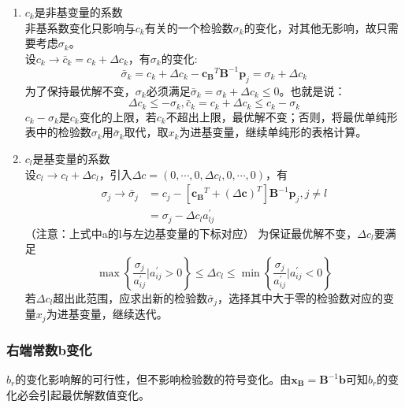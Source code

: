 \documentclass{book}
\begin{document}
\begin{enumerate}
    \item $c_k$是非基变量的系数\\
          非基系数变化只影响与$c_k$有关的一个检验数$\sigma_k$的变化，对其他无影响，故只需要考虑$\sigma_k$。\\
          设$c_k\rightarrow \bar{c}_k=c_k + \Delta c_k$，有$\sigma_k$的变化:$$\bar{\sigma}_k=c_k + \Delta c_k-\boldsymbol{c_B}^T\boldsymbol{B}^{-1}\boldsymbol{p}_j= \sigma_k+ \Delta c_k$$为了保持最优解不变，$\sigma_k$必须满足$\bar{\sigma}_k=\sigma_k+\Delta c_k\le 0$。也就是说：
          \begin{equation}
              \Delta c_k\le -\sigma_k,\bar{c}_k=c_k+\Delta c_k\le c_k-\sigma_k
              \label{con:2.3}
          \end{equation}
          $c_k-\sigma_k$是$c_k$变化的上限，若$c_k$不超出上限，最优解不变；否则，将最优单纯形表中的检验数$\sigma_k$用$\bar{\sigma}_k$取代，取$x_k$为进基变量，继续单纯形的表格计算。

    \item $c_l$是基变量的系数\\
          设$c_l\rightarrow c_l+\Delta c_l$，引入$\Delta c=(0, \cdots, 0, \Delta c_l, 0, \cdots, 0)$，有
          \begin{align*}
              \sigma_j\rightarrow\bar{\sigma}_j & =c_j-[\boldsymbol{c_B}^T+(\Delta\boldsymbol{c})^T]\boldsymbol{B}^{-1}\boldsymbol{p}_j,j\ne l \\
                                                & =\sigma_j-\Delta c_la_{lj}^{\prime}
          \end{align*}
          （注意：上式中a的l与左边基变量的下标对应）
          为保证最优解不变，$\Delta c_l$要满足$$\max\left\{ \frac{\sigma_j}{a_{ij}^{\prime}}|a_{ij}^{\prime}>0 \right\}\le\Delta c_l\le\min\left\{ \frac{\sigma_j}{a_{ij}^{\prime}}|a_{ij}^{\prime}<0 \right\}$$若$\Delta c_l$超出此范围，应求出新的检验数$\bar{\sigma}_j$，选择其中大于零的检验数对应的变量$x_j$为进基变量，继续迭代。
\end{enumerate}

\subsubsection{右端常数b变化\textasteriskcentered}

$b_r$的变化影响解的可行性，但不影响检验数的符号变化。由$\boldsymbol{x_B}=\boldsymbol{B}^{-1}\boldsymbol{b}$可知$b_r$的变化必会引起最优解数值变化。
\end{document}
